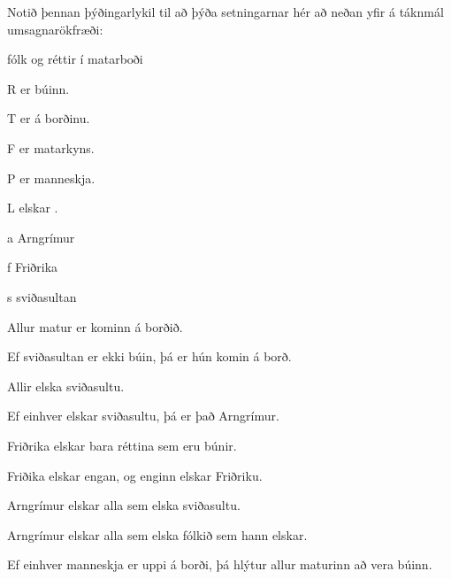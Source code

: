 \problempart
Notið þennan þýðingarlykil til að þýða setningarnar hér að neðan yfir á táknmál umsagnarökfræði:
\begin{ekey}
\item[\text{yfirgrip}] fólk og réttir í matarboði
\item[R]  er búinn.
\item[T]  er á borðinu.
\item[F]  er matarkyns.
\item[P]  er manneskja.
\item[L]  elskar .
\item[a] Arngrímur
\item[f] Friðrika
\item[s] sviðasultan
\end{ekey}
\begin{earg}
\item Allur matur er kominn á borðið.
\item Ef sviðasultan er ekki búin, þá er hún komin á borð.
\item Allir elska sviðasultu.
\item Ef einhver elskar sviðasultu, þá er það Arngrímur.
\item Friðrika elskar bara réttina sem eru búnir.
\item Friðika elskar engan, og enginn elskar Friðriku.
\item Arngrímur elskar alla sem elska sviðasultu.
\item Arngrímur elskar alla sem elska fólkið sem hann elskar.
\item Ef einhver manneskja er uppi á borði, þá hlýtur allur maturinn að vera búinn.
\end{earg}

